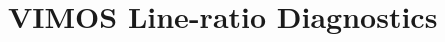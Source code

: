 \documentclass[a4paper,fleqn,usenatbib]{mnras}
\newcommand{\bracket}[1]{[#1]} %
\begin{document}








\appendix
\section{VIMOS Line-ratio Diagnostics}
\label{sec:Decrement}

% 
%
\end{document}
